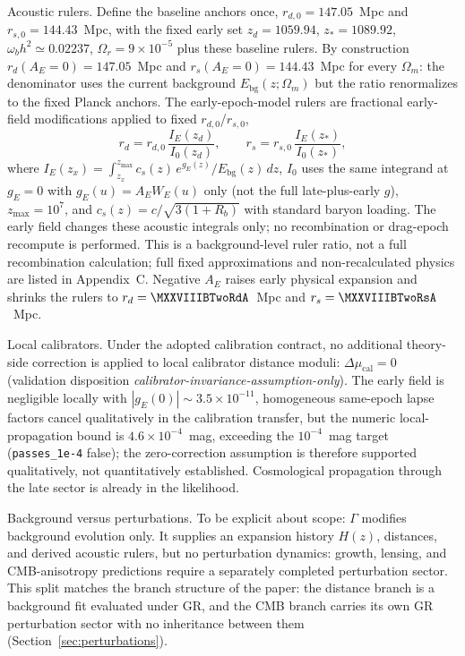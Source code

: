 Acoustic rulers. Define the baseline anchors once,
$r_{d,0}=147.05$~Mpc and $r_{s,0}=144.43$~Mpc, with the fixed early set
$z_{d}=1059.94$, $z_{*}=1089.92$,
$\omega_{b}h^{2}\simeq0.02237$, $\Omega_{r}=9\times10^{-5}$ plus these
baseline rulers. By construction $r_{d}(A_{E}=0)=147.05$~Mpc and
$r_{s}(A_{E}=0)=144.43$~Mpc for every $\Omega_{m}$: the denominator
uses the current background $E_{\mathrm{bg}}(z;\Omega_{m})$ but the
ratio renormalizes to the fixed Planck anchors. The early-epoch-model rulers are
fractional early-field modifications applied to fixed $r_{d,0}$/$r_{s,0}$,
\begin{equation}
  r_{d} = r_{d,0}\,\frac{I_{E}(z_{d})}{I_{0}(z_{d})},
  \qquad
  r_{s} = r_{s,0}\,\frac{I_{E}(z_{*})}{I_{0}(z_{*})},
  \label{eq:rulers}
\end{equation}
where $I_{E}(z_{x})=\int_{z_{x}}^{z_{\max}}c_{s}(z)\,e^{g_{E}(z)}/E_{\mathrm{bg}}(z)\,dz$,
$I_{0}$ uses the same integrand at $g_{E}=0$ with
$g_{E}(u)=A_{E}W_{E}(u)$ only (not the full late-plus-early $g$),
$z_{\max}=10^{7}$, and $c_{s}(z) = c/\sqrt{3(1+R_{b})}$ with standard
baryon loading. The early field changes these acoustic integrals only;
no recombination or drag-epoch recompute is performed. This is a
background-level ruler ratio, not a full recombination calculation;
full fixed approximations and non-recalculated physics are listed in
Appendix~C. Negative $A_{E}$ raises early physical expansion and shrinks the rulers
to $r_{d}=\MXXVIIIBTwoRdA$~Mpc and $r_{s}=\MXXVIIIBTwoRsA$~Mpc.

Local calibrators. Under the adopted calibration contract, no
additional theory-side correction is applied to local calibrator
distance moduli: $\Delta\mu_{\mathrm{cal}}=0$
(validation disposition \textit{calibrator-invariance-assumption-only}). The early field is
negligible locally with $|g_{E}(0)|\sim3.5\times10^{-11}$, homogeneous same-epoch lapse
factors cancel qualitatively in the calibration transfer, but the numeric
local-propagation bound is $4.6\times10^{-4}$~mag, exceeding the $10^{-4}$~mag
target (\texttt{passes\_1e-4} false); the zero-correction assumption is therefore
supported qualitatively, not quantitatively established. Cosmological propagation
through the late sector is already in the likelihood.

Background versus perturbations. To be explicit about scope:
$\Gamma$ modifies background evolution only. It supplies an expansion
history $H(z)$, distances, and derived acoustic rulers, but no
perturbation dynamics: growth, lensing, and CMB-anisotropy predictions
require a separately completed perturbation sector. This split matches
the branch structure of the paper: the distance branch is a background
fit evaluated under GR, and the CMB branch carries its own GR
perturbation sector with no inheritance between them
(Section~\ref{sec:perturbations}).


